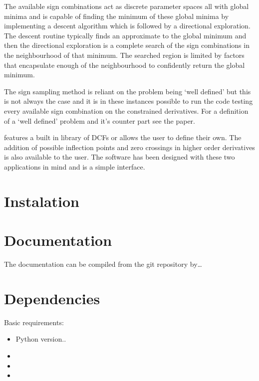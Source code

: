 \documentclass[letterpaper,10pt,english]{sphinxmanual}
\begin{document}
The available sign combinations act as discrete parameter spaces all with
global minima and  is capable of finding the minimum of these global
minima by implementing a descent algorithm which is followed by a directional
exploration. The descent routine typically finds an approximate to the global
minimum and then the directional exploration is a complete search
of the sign combinations in the neighbourhood
of that minimum. The searched region is limited by factors
that encapsulate enough of the neighbourhood to confidently return the global minimum.

The sign sampling method is reliant on the problem being ‘well defined’ but this
is not always the case and it is in these instances possible to run the code testing
every available sign combination on the constrained derivatives. For a definition of
a ‘well defined’ problem and it’s counter part see the  paper.

 features a built in library of DCFs or
allows the user to define their own. The addition of possible inflection points
and zero crossings in higher order derivatives is also available to the user.
The software has been designed with these two
applications in mind and is a simple interface.


\section{Instalation}
\label{\detokenize{source/intro:instalation}}

\section{Documentation}
\label{\detokenize{source/intro:documentation}}
The documentation can be compiled from the git repository by…


\section{Dependencies}
\label{\detokenize{source/intro:dependencies}}
Basic requirements:
\begin{itemize}
\item {} 
Python version..

\item {} 

\item {} 

\item {} 

\end{itemize}
\end{document}
